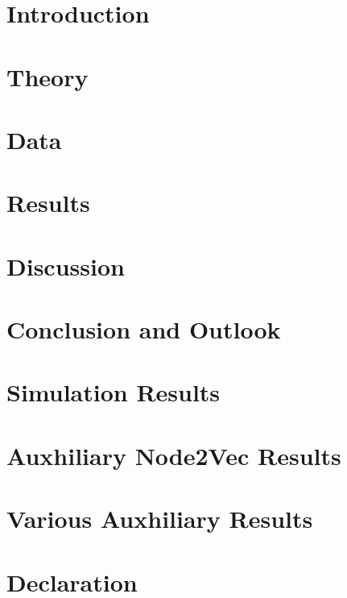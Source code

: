 \documentclass[12pt]{report}
\begin{document}
  \printacronyms[include=abbrev,name=List of Abbreviations]
  \newpage

  \onehalfspacing
  \chapter{Introduction}
  


  \chapter{Theory}
  \label{section:theory}
  
  \newpage
 

  \chapter{Data}
  \label{section:data}
  
  \newpage
  
  \chapter{Results}
  \label{section:results}
  
  \newpage
  
  \chapter{Discussion}
  \label{section:discussion}
  
  \newpage

  \chapter{Conclusion and Outlook}
  \label{section:conclusion_outlook}
  
  \newpage


  \renewcommand\bibname{References}
  
  \newpage

  \appendix
  \chapter{Simulation Results}
  
  \newpage

  \chapter{Auxhiliary Node2Vec Results}
  
  \newpage

  \chapter{Various Auxhiliary Results}
  
  \newpage

  \chapter*{Declaration}
  
\end{document}
